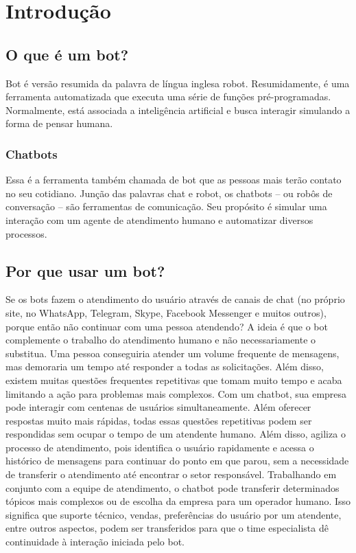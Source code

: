 \chapter{Introdução}
\label{introducao}

\section{O que é um bot?}
 
    Bot é versão resumida da palavra de língua inglesa robot. Resumidamente, é uma ferramenta automatizada que executa uma série de funções pré-programadas. Normalmente, está associada a inteligência artificial e busca interagir simulando a forma de pensar humana.
 
\subsection{Chatbots}
 
     Essa é a ferramenta também chamada de bot que as pessoas mais terão contato no seu cotidiano. Junção das palavras chat e robot, os chatbots – ou robôs de conversação – são ferramentas de comunicação. Seu propósito é simular uma interação com um agente de atendimento humano e automatizar diversos processos.
 
\section{Por que usar um bot?}

     Se os bots fazem o atendimento do usuário através de canais de chat (no próprio site, no WhatsApp, Telegram, Skype, Facebook Messenger e muitos outros), porque então não continuar com uma pessoa atendendo? A ideia é que o bot complemente o trabalho do atendimento humano e não necessariamente o substitua.
    Uma pessoa conseguiria atender um volume frequente de mensagens, mas demoraria um tempo até responder a todas as solicitações. Além disso, existem muitas questões frequentes repetitivas que tomam muito tempo e acaba limitando a ação para problemas mais complexos. 
    Com um chatbot, sua empresa pode interagir com centenas de usuários simultaneamente. Além oferecer respostas muito mais rápidas, todas essas questões repetitivas podem ser respondidas sem ocupar o tempo de um atendente humano. Além disso, agiliza o processo de atendimento, pois identifica o usuário rapidamente e acessa o histórico de mensagens para continuar do ponto em que parou, sem a necessidade de transferir o atendimento até encontrar o setor responsável.
    Trabalhando em conjunto com a equipe de atendimento, o chatbot pode transferir determinados tópicos mais complexos ou de escolha da empresa para um operador humano. Isso significa que suporte técnico, vendas, preferências do usuário por um atendente, entre outros aspectos, podem ser transferidos para que o time especialista dê continuidade à interação iniciada pelo bot.
